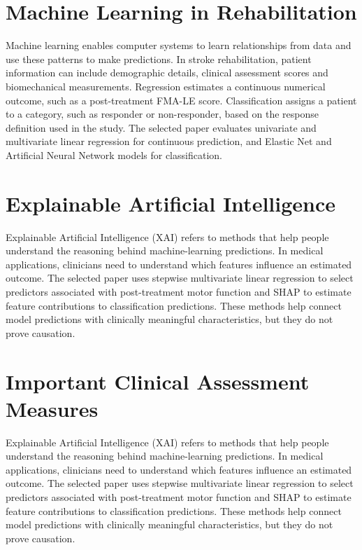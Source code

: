 \section{Machine Learning in Rehabilitation}
Machine learning enables computer systems to learn relationships from data and use these patterns to
make predictions. In stroke rehabilitation, patient information can include demographic details, clinical
assessment scores and biomechanical measurements.
Regression estimates a continuous numerical outcome, such as a post-treatment FMA-LE score.
Classification assigns a patient to a category, such as responder or non-responder, based on the
response definition used in the study. The selected paper evaluates univariate and multivariate linear
regression for continuous prediction, and Elastic Net and Artificial Neural Network models for
classification.\cite{bib1}
\section{Explainable Artificial Intelligence}
Explainable Artificial Intelligence (XAI) refers to methods that help people understand the reasoning
behind machine-learning predictions. In medical applications, clinicians need to understand which
features influence an estimated outcome.
The selected paper uses stepwise multivariate linear regression to select predictors associated with
post-treatment motor function and SHAP to estimate feature contributions to classification predictions.
These methods help connect model predictions with clinically meaningful characteristics, but they do
not prove causation.\cite{bib1}

\section{Important Clinical Assessment Measures}
Explainable Artificial Intelligence (XAI) refers to methods that help people understand the reasoning
behind machine-learning predictions. In medical applications, clinicians need to understand which
features influence an estimated outcome.
The selected paper uses stepwise multivariate linear regression to select predictors associated with
post-treatment motor function and SHAP to estimate feature contributions to classification predictions.
These methods help connect model predictions with clinically meaningful characteristics, but they do
not prove causation.\cite{bib1}
